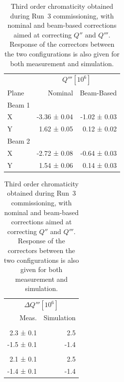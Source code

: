 \begin{table}[!htb]
    \centering
    \begin{minipage}{0.45\linewidth}
        \centering
        \begin{tabular}{lrr}
          \toprule
                  &  \multicolumn{2}{c}{$Q''' [10^6]$}  \\
            Plane & Nominal & Beam-Based \\
          \midrule
            Beam 1    &   & \\
            \hspace{2mm}X     &  -3.36 ± 0.04 &  -1.02 ± 0.03 \\
            \hspace{2mm}Y     &   1.62 ± 0.05 &   0.12 ± 0.02 \\
            Beam 2    &           &               \\
            \hspace{2mm}X     &  -2.72 ± 0.08 &  -0.64 ± 0.03 \\
            \hspace{2mm}Y     &   1.54 ± 0.06 &   0.14 ± 0.03 \\
            \bottomrule
        \end{tabular}
    \end{minipage}%
    \hspace{0.2cm} %
    \hfill
    \hspace{0.2cm}
    \begin{minipage}{0.45\linewidth}
        \centering
        \begin{tabular}{rr}
          \toprule
          \multicolumn{2}{c}{$\Delta Q''' [10^6]$}\\
          Meas.   & Simulation \\
          \midrule
          & \\
          2.3 ± 0.1 &   2.5 \\
          -1.5 ± 0.1 &  -1.4 \\
          &  \\
          2.1 ± 0.1  &  2.5\\
          -1.4 ± 0.1 & -1.4\\
          \bottomrule
        \end{tabular}
    \end{minipage}
    \caption{Third order chromaticity obtained during Run~3 commissioning, with nominal and
             beam-based corrections aimed at correcting $Q''$ and $Q'''$. Response of the correctors
             between the two configurations is also given for both measurement and simulation.}
    \label{table:decapoles:chromaticity:dq3_before_after_beam_based}
\end{table}
  

